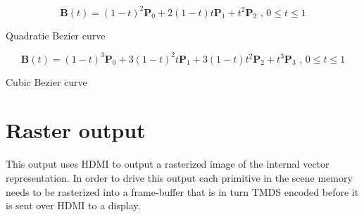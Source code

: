 \begin{cequation}[H]
	\begin{equation*}
		\mathbf{B}(t) = (1 - t)^{2}\mathbf{P}_0 + 2(1 - t)t\mathbf{P}_1 + t^{2}\mathbf{P}_2 \mbox{ , } 0 \le t \le 1
	\end{equation*}
	\caption{Quadratic Bezier curve}
\end{cequation}

\begin{cequation}[H]
	\begin{equation*}
		\mathbf{B}(t)=(1-t)^3\mathbf{P}_0+3(1-t)^2t\mathbf{P}_1+3(1-t)t^2\mathbf{P}_2+t^3\mathbf{P}_3 \mbox{ , } 0 \le t \le 1
	\end{equation*}
	\caption{Cubic Bezier curve}
\end{cequation}


\section{Raster output}

This output uses HDMI to output a rasterized image of the internal vector representation.
In order to drive this output each primitive in the scene memory needs to be rasterized into a frame-buffer that is in turn TMDS encoded before it is sent over HDMI to a display.
